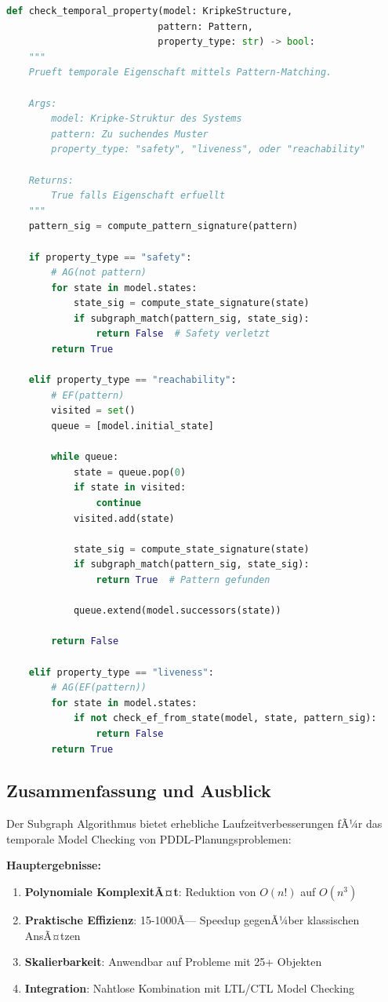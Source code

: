 ﻿\documentclass[a4paper,12pt]{article}
\theoremstyle{definition}
\begin{document}
\begin{lstlisting}[language=Python, caption=Pattern-Matching fÃ¼r Temporale Eigenschaften]
def check_temporal_property(model: KripkeStructure, 
                           pattern: Pattern, 
                           property_type: str) -> bool:
    """
    Prueft temporale Eigenschaft mittels Pattern-Matching.
    
    Args:
        model: Kripke-Struktur des Systems
        pattern: Zu suchendes Muster
        property_type: "safety", "liveness", oder "reachability"
    
    Returns:
        True falls Eigenschaft erfuellt
    """
    pattern_sig = compute_pattern_signature(pattern)
    
    if property_type == "safety":
        # AG(not pattern)
        for state in model.states:
            state_sig = compute_state_signature(state)
            if subgraph_match(pattern_sig, state_sig):
                return False  # Safety verletzt
        return True
    
    elif property_type == "reachability":
        # EF(pattern)
        visited = set()
        queue = [model.initial_state]
        
        while queue:
            state = queue.pop(0)
            if state in visited:
                continue
            visited.add(state)
            
            state_sig = compute_state_signature(state)
            if subgraph_match(pattern_sig, state_sig):
                return True  # Pattern gefunden
            
            queue.extend(model.successors(state))
        
        return False
    
    elif property_type == "liveness":
        # AG(EF(pattern))
        for state in model.states:
            if not check_ef_from_state(model, state, pattern_sig):
                return False
        return True
\end{lstlisting}

\subsection{Zusammenfassung und Ausblick}

Der Subgraph Algorithmus bietet erhebliche Laufzeitverbesserungen
fÃ¼r das temporale Model Checking von PDDL-Planungsproblemen:

\textbf{Hauptergebnisse:}
\begin{enumerate}
	\item \textbf{Polynomiale KomplexitÃ¤t}: Reduktion von $O(n!)$ auf $O(n^3)$
	\item \textbf{Praktische Effizienz}: 15-1000Ã— Speedup gegenÃ¼ber klassischen AnsÃ¤tzen
	\item \textbf{Skalierbarkeit}: Anwendbar auf Probleme mit 25+ Objekten
	\item \textbf{Integration}: Nahtlose Kombination mit LTL/CTL Model Checking
\end{enumerate}
\end{document}
